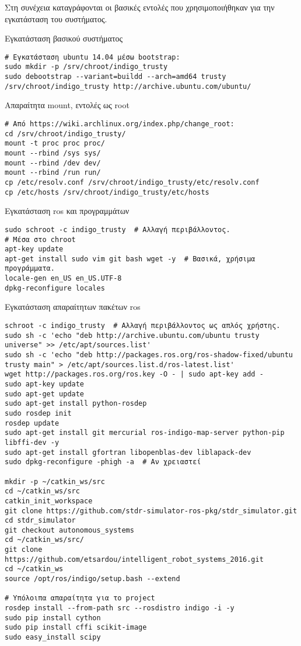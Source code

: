 Στη συνέχεια καταγράφονται οι βασικές εντολές που χρησιμοποιήθηκαν για την εγκατάσταση του συστήματος.
\begin{code}
\caption{Εγκατάσταση βασικού συστήματος}
\begin{verbatim}
# Εγκατάσταση ubuntu 14.04 μέσω bootstrap:
sudo mkdir -p /srv/chroot/indigo_trusty
sudo debootstrap --variant=buildd --arch=amd64 trusty /srv/chroot/indigo_trusty http://archive.ubuntu.com/ubuntu/
\end{verbatim}
\end{code}
\begin{code}
\caption{Απαραίτητα mount, εντολές ως root}
\begin{verbatim}
# Από https://wiki.archlinux.org/index.php/change_root:
cd /srv/chroot/indigo_trusty/
mount -t proc proc proc/
mount --rbind /sys sys/
mount --rbind /dev dev/
mount --rbind /run run/
cp /etc/resolv.conf /srv/chroot/indigo_trusty/etc/resolv.conf
cp /etc/hosts /srv/chroot/indigo_trusty/etc/hosts
\end{verbatim}
\end{code}
\begin{code}
\caption{Εγκατάσταση ros και προγραμμάτων}
\begin{verbatim}
sudo schroot -c indigo_trusty  # Αλλαγή περιβάλλοντος.
# Μέσα στο chroot
apt-key update
apt-get install sudo vim git bash wget -y  # Βασικά, χρήσιμα προγράμματα.
locale-gen en_US en_US.UTF-8
dpkg-reconfigure locales
\end{verbatim}
\end{code}
\begin{code}
\caption{Εγκατάσταση απαραίτητων πακέτων ros}
\begin{verbatim}
schroot -c indigo_trusty  # Αλλαγή περιβάλλοντος ως απλός χρήστης.
sudo sh -c 'echo "deb http://archive.ubuntu.com/ubuntu trusty universe" >> /etc/apt/sources.list'
sudo sh -c 'echo "deb http://packages.ros.org/ros-shadow-fixed/ubuntu trusty main" > /etc/apt/sources.list.d/ros-latest.list'
wget http://packages.ros.org/ros.key -O - | sudo apt-key add -
sudo apt-key update
sudo apt-get update
sudo apt-get install python-rosdep
sudo rosdep init
rosdep update
sudo apt-get install git mercurial ros-indigo-map-server python-pip libffi-dev -y
sudo apt-get install gfortran libopenblas-dev liblapack-dev
sudo dpkg-reconfigure -phigh -a  # Αν χρειαστεί

mkdir -p ~/catkin_ws/src
cd ~/catkin_ws/src
catkin_init_workspace
git clone https://github.com/stdr-simulator-ros-pkg/stdr_simulator.git
cd stdr_simulator
git checkout autonomous_systems
cd ~/catkin_ws/src/
git clone https://github.com/etsardou/intelligent_robot_systems_2016.git
cd ~/catkin_ws
source /opt/ros/indigo/setup.bash --extend

# Υπόλοιπα απαραίτητα για το project
rosdep install --from-path src --rosdistro indigo -i -y
sudo pip install cython
sudo pip install cffi scikit-image
sudo easy_install scipy
\end{verbatim}
\end{code}
